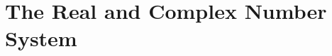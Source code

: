 
\chapter{The Real and Complex Number System}\label{chap:01-the-real-and-complex-number-system}

















